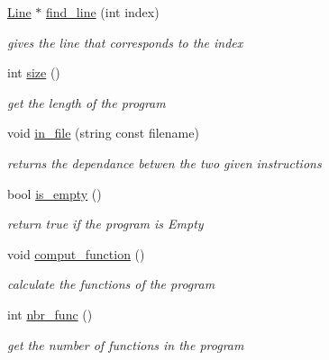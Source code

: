 \begin{DoxyCompactItemize}
\mbox{\hyperlink{class_line}{Line}} $\ast$ \mbox{\hyperlink{class_program_ae897b48e1e1be99578440eb6a38a3a0d}{find\+\_\+line}} (int index)
\begin{DoxyCompactList}\small\item\em gives the line that corresponds to the index \end{DoxyCompactList}\item 
\mbox{\label{class_program_a190f24ecadca14d748408c352aabc219}} 
int \mbox{\hyperlink{class_program_a190f24ecadca14d748408c352aabc219}{size}} ()
\begin{DoxyCompactList}\small\item\em get the length of the program \end{DoxyCompactList}\item 
void \mbox{\hyperlink{class_program_a3db3e17c96bb809c3e6f81b8bc22ee20}{in\+\_\+file}} (string const filename)
\begin{DoxyCompactList}\small\item\em returns the dependance betwen the two given instructions \end{DoxyCompactList}\item 
\mbox{\label{class_program_aff32c461ae544453df5d55f475b3da22}} 
bool \mbox{\hyperlink{class_program_aff32c461ae544453df5d55f475b3da22}{is\+\_\+empty}} ()
\begin{DoxyCompactList}\small\item\em return true if the program is Empty \end{DoxyCompactList}\item 
\mbox{\label{class_program_aa2111257b1f690520316e4831e55798d}} 
void \mbox{\hyperlink{class_program_aa2111257b1f690520316e4831e55798d}{comput\+\_\+function}} ()
\begin{DoxyCompactList}\small\item\em calculate the functions of the program \end{DoxyCompactList}\item 
\mbox{\label{class_program_aa85073d3bd6782af3759f4a2961ae80f}} 
int \mbox{\hyperlink{class_program_aa85073d3bd6782af3759f4a2961ae80f}{nbr\+\_\+func}} ()
\begin{DoxyCompactList}\small\item\em get the number of functions in the program \end{DoxyCompactList}\item 

\end{DoxyCompactItemize}
